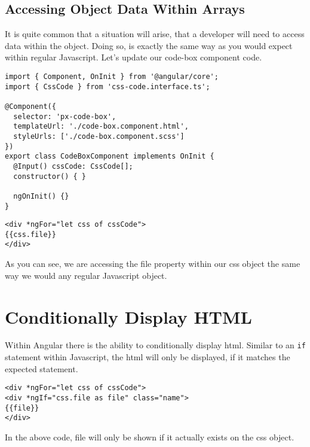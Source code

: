 \subsection{ Accessing Object Data Within Arrays }
It is quite common that a situation will arise, that a developer will need to 
access data within the object. Doing so, is exactly the same way as you would 
expect within regular Javascript. Let's update our code-box component code. 
\begin{lstlisting}[caption=px-code-box.component.ts]
import { Component, OnInit } from '@angular/core';
import { CssCode } from 'css-code.interface.ts';

@Component({
  selector: 'px-code-box',
  templateUrl: './code-box.component.html',
  styleUrls: ['./code-box.component.scss']
})
export class CodeBoxComponent implements OnInit {
  @Input() cssCode: CssCode[];
  constructor() { }

  ngOnInit() {}
} 
\end{lstlisting}
  
\begin{lstlisting}[caption=px-code-box.component.html]
<div *ngFor="let css of cssCode">
{{css.file}}
</div>   
\end{lstlisting} 

As you can see, we are accessing the file property within our css object the
same way we would any regular Javascript object.

\section{ Conditionally Display HTML }
Within Angular there is the ability to conditionally display html. Similar to 
an \lstinline{if} statement within Javascript, the html will only be 
displayed, if it matches the expected statement. 
\begin{lstlisting}
<div *ngFor="let css of cssCode">
<div *ngIf="css.file as file" class="name">
{{file}}
</div>   
\end{lstlisting}

In the above code, file will only be shown if it actually exists on the css 
object. 


